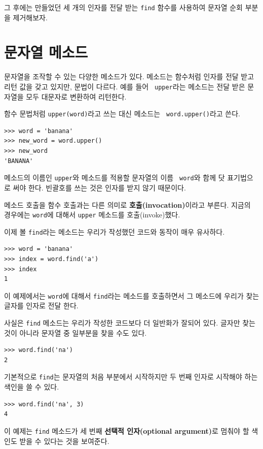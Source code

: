 \documentclass[10pt]{book}
\begin{document}
그 후에는 만들었던 세 개의 인자를 전달 받는 {\tt find} 함수를 사용하여
문자열 순회 부분을 제거해보자.


\section{문자열 메소드}
\label{optional}

문자열을 조작할 수 있는 다양한 메소드가 있다.  메소드는 함수처럼 인자를
전달 받고 리턴 값을 갖고 있지만, 문법이 다르다.  예를 들어 {\tt
  upper}라는 메소드는 전달 받은 문자열을 모두 대문자로 변환하여
리턴한다.

함수 문법처럼 {\tt upper(word)}라고 쓰는 대신 메소드는 {\tt
  word.upper()}라고 쓴다.

\begin{verbatim}
>>> word = 'banana'
>>> new_word = word.upper()
>>> new_word
'BANANA'
\end{verbatim}
%
메소드의 이름인 {\tt upper}와 메소드를 적용할 문자열의 이름 {\tt
  word}와 함께 닷 표기법으로 써야 한다.  빈괄호를 쓰는 것은 인자를 받지
않기 때문이다.

메소드 호출을 함수 호출과는 다른 의미로 {\bf 호출(invocation)}이라고
부른다.  지금의 경우에는 {\tt word}에 대해서 {\tt upper} 메소드를
호출(invoke)했다.

이제 볼 {\tt find}라는 메소드는 우리가 작성했던 코드와 동작이 매우 유사하다. 

\begin{verbatim}
>>> word = 'banana'
>>> index = word.find('a')
>>> index
1
\end{verbatim}
%
이 예제에서는 {\tt word}에 대해서 {\tt find}라는 메소드를 호출하면서 그
메소드에 우리가 찾는 글자를 인자로 전달 한다.

사실은 {\tt find} 메소드는 우리가 작성한 코드보다 더 일반화가 잘되어
있다.  글자만 찾는 것이 아니라 문자열 중 일부분을 찾을 수도 있다.

\begin{verbatim}
>>> word.find('na')
2
\end{verbatim}
%
기본적으로 {\tt find}는 문자열의 처음 부분에서 시작하지만 두 번째
인자로 시작해야 하는 색인을 쓸 수 있다.

\begin{verbatim}
>>> word.find('na', 3)
4
\end{verbatim}
%
이 예제는 {\tt find} 메소드가 세 번째 {\bf 선택적 인자(optional
  argument)}로 멈춰야 할 색인도 받을 수 있다는 것을 보여준다.
\end{document}
